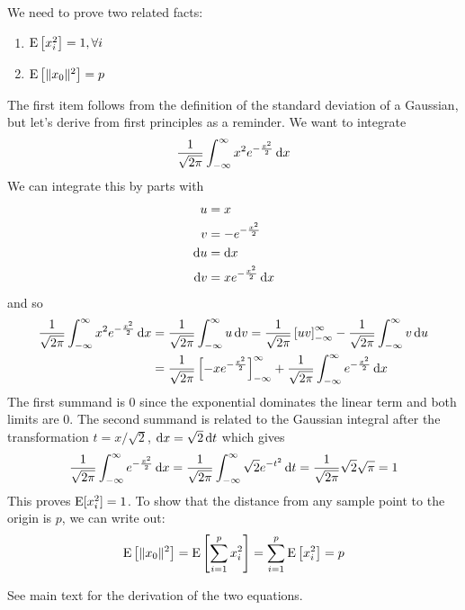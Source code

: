 We need to prove two related facts:
\begin{enumerate}
  \item{$\mathrm{E}\left[x_i^2\right] = 1, \forall i$}
  \item{$\mathrm{E}\left[\|x_0\|^2\right] = p$}
\end{enumerate}
The first item follows from the definition of the standard deviation of a Gaussian, but let's derive from first principles as a reminder. We want to integrate
\begin{align*}
  \frac{1}{\sqrt{2\pi}}\int_{-\infty}^{\infty} x^2 e^{-\frac{x^2}{2}}\operatorname{d}\!{x}
\end{align*}
We can integrate this by parts with
\begin{align*}
  u &= x\\
  v &= -e^{-\frac{x^2}{2}}\\
  \operatorname{d}\!{u} &= \operatorname{d}\!{x}\\
  \operatorname{d}\!{v} &= xe^{-\frac{x^2}{2}}\operatorname{d}\!{x}
\end{align*}
and so
\begin{align*}
  \frac{1}{\sqrt{2\pi}}\int_{-\infty}^{\infty} x^2 e^{-\frac{x^2}{2}}\operatorname{d}\!{x} &= \frac{1}{\sqrt{2\pi}}\int_{-\infty}^{\infty} u \operatorname{d}\!{v} =\frac{1}{\sqrt{2\pi}} \left[uv\right]_{-\infty}^{\infty} - \frac{1}{\sqrt{2\pi}}\int_{-\infty}^{\infty} v \operatorname{d}\!{u}\\
                                                                          &= \frac{1}{\sqrt{2\pi}} \left[-xe^{-\frac{x^2}{2}}\right]_{-\infty}^{\infty} + \frac{1}{\sqrt{2\pi}} \int_{-\infty}^{\infty} e^{-\frac{x^2}{2}}\operatorname{d}\!{x}
\end{align*}
The first summand is $0$ since the exponential dominates the linear term and both limits are $0$. The second summand is related to the Gaussian integral after the transformation $t = x / \sqrt{2}$, $\operatorname{d}\!{x} = \sqrt{2}\operatorname{d}\!{t}$ which gives
\begin{align*}
  \frac{1}{\sqrt{2\pi}} \int_{-\infty}^{\infty} e^{-\frac{x^2}{2}}\operatorname{d}\!{x} = \frac{1}{\sqrt{2\pi}} \int_{-\infty}^{\infty} \sqrt{2} e^{-t^2}\operatorname{d}\!{t} = \frac{1}{\sqrt{2\pi}} \sqrt{2}\sqrt{\pi} = 1
\end{align*}
This proves $\mathrm{E}[x_i^2] = 1$. To show that the distance from any sample point to the origin is $p$, we can write out:
$$
\mathrm{E}\left[\|x_0\|^2\right] = \mathrm{E}\left[\sum_{i=1}^p x_i^2\right] = \sum_{i = 1}^p \mathrm{E}\left[x_i^2\right] = p
$$

See main text for the derivation of the two equations.

